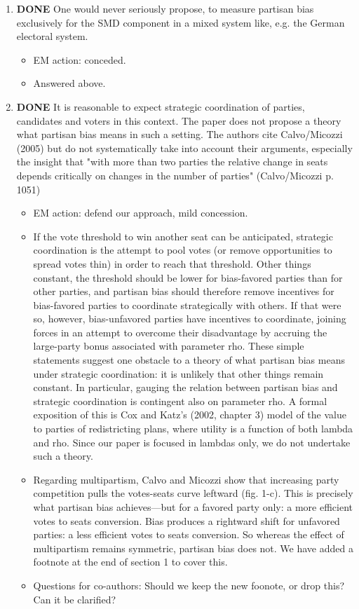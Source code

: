 \documentclass{article}
\begin{document}
\begin{enumerate}
\item {\bfseries\sffamily DONE} One would never seriously propose, to measure partisan bias exclusively for the SMD component in a mixed system like, e.g. the German electoral system.
\label{sec:orgheadline24}
\begin{itemize}
\item EM action: conceded.
\item Answered above.
\end{itemize}
\item {\bfseries\sffamily DONE} It is reasonable to expect strategic coordination of parties, candidates and voters in this context. The paper does not propose a theory what partisan bias means in such a setting. The authors cite Calvo/Micozzi (2005) but do not systematically take into account their arguments, especially the insight that "with more than two parties the relative change in seats depends critically on changes in the number of parties" (Calvo/Micozzi p. 1051)
\label{sec:orgheadline25}
\begin{itemize}
\item EM action: defend our approach, mild concession.
\item If the vote threshold to win another seat can be anticipated, strategic coordination is the attempt to pool votes (or remove opportunities to spread votes thin) in order to reach that threshold. Other things constant, the threshold should be lower for bias-favored parties than for other parties, and partisan bias should therefore remove incentives for bias-favored parties to coordinate strategically with others. If that were so, however, bias-unfavored parties have incentives to coordinate, joining forces in an attempt to overcome their disadvantage by accruing the large-party bonus associated with parameter rho. These simple statements suggest one obstacle to a theory of what partisan bias means under strategic coordination: it is unlikely that other things remain constant. In particular, gauging the relation between partisan bias and strategic coordination is contingent also on parameter rho. A formal exposition of this is Cox and Katz's (2002, chapter 3) model of the value to parties of redistricting plans, where utility is a function of both lambda and rho. Since our paper is focused in lambdas only, we do not undertake such a theory.
\item Regarding multipartism, Calvo and Micozzi show that increasing party competition pulls the votes-seats curve leftward (fig. 1-c). This is precisely what partisan bias achieves---but for a favored party only: a more efficient votes to seats conversion. Bias produces a rightward shift for unfavored parties: a less efficient votes to seats conversion. So whereas the effect of multipartism remains symmetric, partisan bias does not. We have added a footnote at the end of section 1 to cover this.
\item Questions for co-authors: Should we keep the new foonote, or drop this? Can it be clarified?
\end{itemize}


\end{enumerate}
\end{document}
